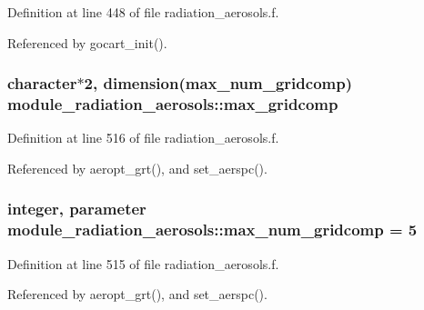 Definition at line 448 of file radiation\+\_\+aerosols.\+f.



Referenced by gocart\+\_\+init().

\subsubsection[{\texorpdfstring{max\+\_\+gridcomp}{max_gridcomp}}]{\setlength{\rightskip}{0pt plus 5cm}character$\ast$2, dimension(max\+\_\+num\+\_\+gridcomp) module\+\_\+radiation\+\_\+aerosols\+::max\+\_\+gridcomp\hspace{0.3cm}{\ttfamily [private]}}\hypertarget{group__module__radiation__aerosols_gac8278b0db773d6ba6ab4d71c9bb1b109}{}\label{group__module__radiation__aerosols_gac8278b0db773d6ba6ab4d71c9bb1b109}


Definition at line 516 of file radiation\+\_\+aerosols.\+f.



Referenced by aeropt\+\_\+grt(), and set\+\_\+aerspc().

\subsubsection[{\texorpdfstring{max\+\_\+num\+\_\+gridcomp}{max_num_gridcomp}}]{\setlength{\rightskip}{0pt plus 5cm}integer, parameter module\+\_\+radiation\+\_\+aerosols\+::max\+\_\+num\+\_\+gridcomp = 5\hspace{0.3cm}{\ttfamily [private]}}\hypertarget{group__module__radiation__aerosols_gad1187b5d87889c68cbe5929e20e83ac7}{}\label{group__module__radiation__aerosols_gad1187b5d87889c68cbe5929e20e83ac7}


Definition at line 515 of file radiation\+\_\+aerosols.\+f.



Referenced by aeropt\+\_\+grt(), and set\+\_\+aerspc().

